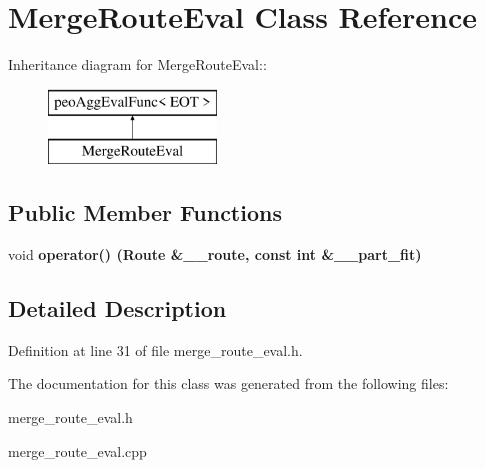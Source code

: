 \section{Merge\-Route\-Eval Class Reference}
\label{class_merge_route_eval}
Inheritance diagram for Merge\-Route\-Eval::\begin{figure}[H]
\begin{center}
\leavevmode
\includegraphics[height=2cm]{class_merge_route_eval}
\end{center}
\end{figure}
\subsection*{Public Member Functions}
\begin{CompactItemize}
\item 
void \bf{operator()} (Route \&\_\-\_\-route, const int \&\_\-\_\-part\_\-fit)\label{class_merge_route_eval_29cb0028ac0df4b2cee3a809c8f35dea}

\end{CompactItemize}


\subsection{Detailed Description}




Definition at line 31 of file merge\_\-route\_\-eval.h.

The documentation for this class was generated from the following files:\begin{CompactItemize}
\item 
merge\_\-route\_\-eval.h\item 
merge\_\-route\_\-eval.cpp\end{CompactItemize}
